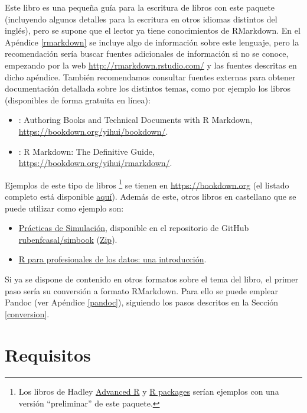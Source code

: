 \documentclass[]{book}
\let\rmarkdownfootnote\footnote%
\def\footnote{\protect\rmarkdownfootnote}
\theoremstyle{definition}
\theoremstyle{definition}
\theoremstyle{definition}
\theoremstyle{remark}
\begin{document}
Este libro es una pequeña guía para la escritura de libros con este
paquete (incluyendo algunos detalles para la escritura en otros idiomas
distintos del inglés), pero se supone que el lector ya tiene
conocimientos de RMarkdown. En el Apéndice \ref{rmarkdown} se incluye
algo de información sobre este lenguaje, pero la recomendación sería
buscar fuentes adicionales de información si no se conoce, empezando por
la web \url{http://rmarkdown.rstudio.com/} y las fuentes descritas en
dicho apéndice. También recomendamos consultar fuentes externas para
obtener documentación detallada sobre los distintos temas, como por
ejemplo los libros (disponibles de forma gratuita en línea):

\begin{itemize}
\item
  \citet{R-bookdown} : Authoring Books and Technical Documents with R
  Markdown, \url{https://bookdown.org/yihui/bookdown/}.
\item
  \citet{xie2018r} : R Markdown: The Definitive Guide,
  \url{https://bookdown.org/yihui/rmarkdown/}.
\end{itemize}

Ejemplos de este tipo de libros \footnote{Los libros de Hadley
  \href{http://adv-r.had.co.nz}{Advanced R} y
  \href{http://r-pkgs.had.co.nz}{R packages} serían ejemplos con una
  versión ``preliminar'' de este paquete.} se tienen en
\url{https://bookdown.org} (el listado completo está disponible
\href{https://bookdown.org/home/archive/}{aquí}). Además de este, otros
libros en castellano que se puede utilizar como ejemplo son:

\begin{itemize}
\item
  \href{https://rubenfcasal.github.io/simbook}{Prácticas de Simulación},
  disponible en el repositorio de GitHub
  \href{https://github.com/rubenfcasal/simbook}{rubenfcasal/simbook}
  (\href{https://github.com/rubenfcasal/simbook/archive/master.zip}{Zip}).
\item
  \href{https://www.datanalytics.com/libro_r/index.html}{R para
  profesionales de los datos: una introducción}.
\end{itemize}

Si ya se dispone de contenido en otros formatos sobre el tema del libro,
el primer paso sería su conversión a formato RMarkdown. Para ello se
puede emplear Pandoc (ver Apéndice \ref{pandoc}), siguiendo los pasos
descritos en la Sección \ref{conversion}.

\section{Requisitos}\label{requisitos}
\end{document}
